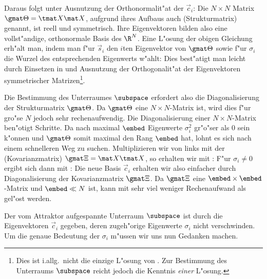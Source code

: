  Daraus folgt unter Ausnutzung der Orthonormalit"at der $\vec c_i$:
Die $N\times N$ Matrix $\gmat \Theta = \tmat X \mat X$, aufgrund ihres Aufbaus auch
\begriff(Strukturmatrix) genannt, ist reell und symmetrisch. Ihre
Eigenvektoren bilden also eine vollst"andige, orthonormale Basis des $\R^N$. 
Eine L"osung der obigen Gleichung erh"alt man, indem man f"ur $\vec s_i$ 
den $i$ten Eigenvektor von $\gmat \Theta$ sowie f"ur $\sigma_i$ die Wurzel des entsprechenden Eigenwerts w"ahlt:
Dies best"atigt man leicht durch Einsetzen in  und Ausnutzung der Orthogonalit"at der
Eigenvektoren symmetrischer Matrizen\footnote{Dies ist i.allg.\  nicht die einzige L"osung 
  von . Zur Bestimmung des Unterraums $\subspace$ reicht jedoch die
  Kenntnis {\em einer} L"osung. }. 

Die Bestimmung des Unterraumes $\subspace$ erfordert also die
Diagonalisierung der Strukturmatrix $\gmat \Theta$. Da $\gmat \Theta$
eine $N\times N$-Matrix ist, wird dies f"ur gro"se $N$ jedoch
sehr rechenaufwendig. Die Diagonalisierung einer $N\times N$-Matrix ben"otigt 
Schritte. 
 Da nach  maximal $\embed$ Eigenwerte
$\sigma_i^2$ gr"o"ser als 0 sein k"onnen und $\gmat \Theta$ somit maximal den Rang
$\embed$ hat, lohnt es sich nach einem schnelleren Weg zu suchen. 
Multiplizieren wir  von links mit der
\begriff(Kovarianzmatrix) $\gmat \Xi = \mat X \tmat X$, so erhalten wir mit :
F"ur $\sigma_i\neq 0$ ergibt sich dann mit :
Die neue Basis $\vec c_i$ erhalten wir  
also einfacher durch Diagonalisierung der Kovarianzmatrix $\gmat \Xi$. Da $\gmat \Xi$ eine
$\embed\times\embed$-Matrix und $\embed\ll N$ ist, kann  mit sehr viel
weniger Rechenaufwand als  gel"ost werden.

Der vom Attraktor aufgespannte Unterraum $\subspace$ ist durch die Eigenvektoren $\vec
c_i$ gegeben, deren zugeh"orige Eigenwerte $\sigma_i$ nicht verschwinden. Um die genaue
Bedeutung der $\sigma_i$ m"ussen wir uns nun Gedanken machen.


